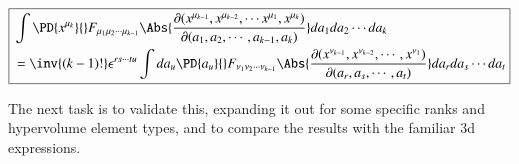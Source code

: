 \begin{equation}\label{eqn:antisymmetricTensorTx:650}
\boxed{
\begin{aligned}
&\int
\PD{x^{\mu_k}}{} F_{\mu_1 \mu_2 \cdots \mu_{k-1}}
\Abs{\frac{\partial(
x^{\mu_{k-1}},
x^{\mu_{k-2}},
\cdots
x^{\mu_{1}},
x^{\mu_{k}}
)}{\partial(a_1, a_2, \cdots, a_{k-1}, a_k)}
}
da_1 da_2 \cdots da_k \\
&=
\inv{(k-1)!} \epsilon^{ r s \cdots t u } \int da_u \PD{a_{u}}{} F_{\nu_1 \nu_2 \cdots \nu_{k-1} }
\Abs{\frac{\partial(
x^{\nu_{k-1}},x^{\nu_{k-2}},\cdots,x^{\nu_1}
)}{\partial(a_r, a_s, \cdots, a_t)}}
da_r da_s \cdots da_t 
\end{aligned}
}
\end{equation}

The next task is to validate this, expanding it out for some specific ranks and hypervolume element types, and to compare the results with the familiar 3d expressions.

\EndArticle
